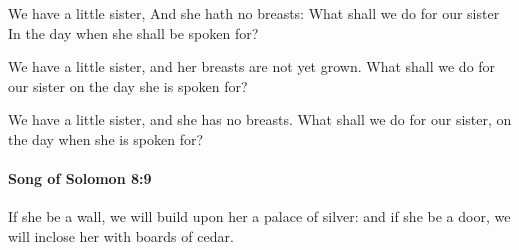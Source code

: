 			\begin{versebox}
					\item[BHS] 
					\item[LXX] 
					\item[ASV] We have a little sister, And she hath no breasts: What shall we do for our sister In the day when she shall be spoken for?
					\item[NIV] We have a little sister, and her breasts are not yet grown. What shall we do for our sister on the day she is spoken for?
					\item[NRSV] We have a little sister, and she has no breasts. What shall we do for our sister, on the day when she is spoken for?
			\end{versebox}

		\paragraph{Song of Solomon 8:9} %
			\label{SONGOFSOLOMON-8-9}

			If she be a wall, we will build upon her a palace of silver: and if she be a door, we will inclose her with boards of cedar.

